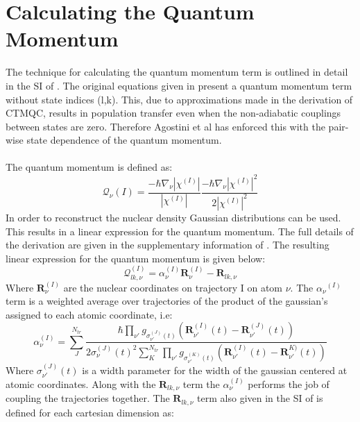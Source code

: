  \section{Calculating the Quantum Momentum \label{sec:calc_QM}}
 The technique for calculating the quantum momentum term is outlined in detail in the SI of \cite{min_ab_2017}. The original equations given in \cite{agostini_quantum-classical_2016} present a quantum momentum term without state indices (l,k). This, due to approximations made in the derivation of CTMQC, results in population transfer even when the non-adiabatic couplings between states are zero. Therefore Agostini et al has enforced this with the pair-wise state dependence of the quantum momentum.
 \\\\
The quantum momentum is defined as:
\begin{equation}
  \mathcal{Q}_{\nu}{(I)} = \frac{-\hbar \nabla_{\nu} |\chi^{(I)}|}{|\chi^{(I)}|} \frac{-\hbar \nabla_{\nu} |\chi^{(I)}|^2}{2|\chi^{(I)}|^2}
  \label{eq:QM_def}
\end{equation}
In order to reconstruct the nuclear density Gaussian distributions can be used. This results in a linear expression for the quantum momentum.
The full details of the derivation are given in the supplementary information of \cite{min_ab_2017}. The resulting linear expression for the quantum momentum is given below:
\begin{equation}
  \mathcal{Q}_{lk, \nu}^{(I)} = \alpha_{\nu}^{(I)} \textbf{R}_{\nu}^{(I)} - \textbf{R}_{lk, \nu}
  \label{eq:QM_lin}
\end{equation}
Where $\textbf{R}_{\nu}^{(I)}$ are the nuclear coordinates on trajectory I on atom $\nu$. The $\alpha_{\nu}{^(I)}$ term is a weighted average over trajectories of the product of the gaussian's assigned to each atomic coordinate, i.e:
\begin{equation}
  \alpha_{\nu}^{(I)} = \sum_{J}^{N_{tr}} \frac{\hbar \prod_{\nu'} g_{\sigma_{\nu'}^{(J)}(t)}\left(\textbf{R}_{\nu'}^{(I)}(t) - \textbf{R}_{\nu'}^{(J)}(t)\right)}   {2 \sigma_{\nu}^{(J)}(t)^2\sum_{K}^{N_{tr}}\prod_{\nu'} g_{\sigma_{\nu'}^{(K)}(t)}\left(\textbf{R}_{\nu'}^{(I)}(t) - \textbf{R}_{\nu'}^{K)}(t)\right)}
  \label{eq:alpha}
\end{equation}
Where $\sigma_{\nu'}^{(J)}(t)$ is a width parameter for the width of the gaussian centered at atomic coordinates. Along with the $\textbf{R}_{lk, \nu}$ term the $\alpha_{\nu}^{(I)}$ performs the job of coupling the trajectories together. The $\textbf{R}_{lk, \nu}$ term also given in the SI of \cite{min_ab_2017} is defined for each cartesian dimension as:
